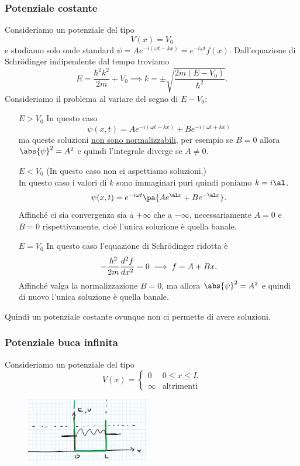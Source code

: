 \subsubsection{Potenziale costante}
Consideriamo un potenziale del tipo
\[V(x)=V_0\]
e studiamo solo onde standard $\psi=Ae^{-i(\omega t-kx)}=e^{-i\omega t}f(x)$. Dall'equazione di Schr\"odinger indipendente dal tempo troviamo
\[E=\frac{\hbar^2 k^2}{2m}+V_0\implies k=\pm\sqrt{\frac{2m(E-V_0)}{\hbar^2}}.\]
Consideriamo il problema al variare del segno di $E-V_0$:
\setlength{\leftmargini}{0cm}
\begin{itemize}
\item[$\boxed{E>V_0}$] In questo caso 
\[\psi(x,t)=Ae^{-i(\omega t-kx)}+Be^{-i(\omega t+kx)}\]
ma queste soluzioni \underline{non sono normalizzabili}, per esempio se $B=0$ allora $\abs{\psi}^2=A^2$ e quindi l'integrale diverge se $A\neq 0$.
\item[$\boxed{E<V_0}$] (In questo caso non ci aspettiamo soluzioni.)\\
In questo caso i valori di $k$ sono immaginari puri quindi poniamo $k=i\al$.
\[\psi(x,t)=e^{-i\omega t}\pa{Ae^{\al x}+B e^{-\al x}}.\]
Affinch\'e ci sia convergenza sia a $+\infty$ che a $-\infty$, necessariamente $A=0$ e $B=0$ rispettivamente, cio\`e l'unica soluzione \`e quella banale.
\item[$\boxed{E=V_0}$] In questo caso l'equazione di Schr\"odinger ridotta \`e
\[-\frac{\hbar^2}{2m}\dds[2]x f=0\implies f=A+Bx.\]
Affinch\'e valga la normalizzazione $B=0$, ma allora $\abs{\psi}^2=A^2$ e quindi di nuovo l'unica soluzione \`e quella banale.
\end{itemize}
\setlength{\leftmargini}{0.5cm}
Quindi un potenziale costante ovunque non ci permette di avere soluzioni.


\subsubsection{Potenziale buca infinita}
Consideriamo un potenziale del tipo
\[V(x)=\begin{cases}
0 &0\leq x\leq L\\
\infty &\text{altrimenti}
\end{cases}\]

\begin{figure}[!htb]
    \centering
    \includegraphics[width=5.4cm]{images/buca_infinita.png}
\end{figure}

